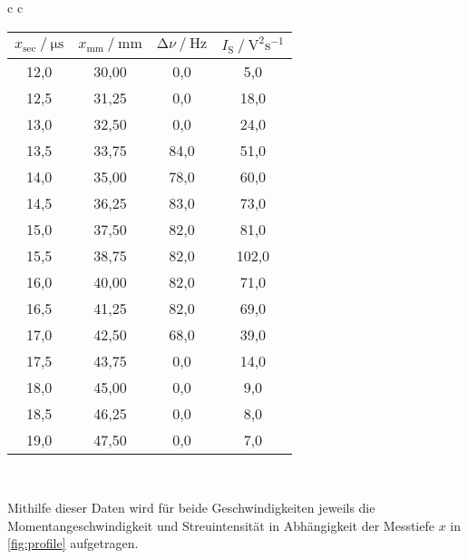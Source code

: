 \begin{table}[H]
\begin{tabular}{c c}
      \begin{tabular}{c c c c} 
          \hline
          \toprule
          $x_\text{sec} \mathbin{/} \unit{\micro\second}$ &
          $x_\text{mm} \mathbin{/} \unit{\milli\meter}$ &
          $\increment \nu \mathbin{/} \mathrm{Hz}$ &
          $I_\text{S} \mathbin{/} \mathrm{V^2 s^{-1}}$ \\
          \midrule
          12,0 & 30,00 &  0,0 &   5,0 \\
          12,5 & 31,25 &  0,0 &  18,0 \\
          13,0 & 32,50 &  0,0 &  24,0 \\
          13,5 & 33,75 & 84,0 &  51,0 \\
          14,0 & 35,00 & 78,0 &  60,0 \\
          14,5 & 36,25 & 83,0 &  73,0 \\
          15,0 & 37,50 & 82,0 &  81,0 \\
          15,5 & 38,75 & 82,0 & 102,0 \\
          16,0 & 40,00 & 82,0 &  71,0 \\
          16,5 & 41,25 & 82,0 &  69,0 \\
          17,0 & 42,50 & 68,0 &  39,0 \\
          17,5 & 43,75 &  0,0 &  14,0 \\
          18,0 & 45,00 &  0,0 &   9,0 \\
          18,5 & 46,25 &  0,0 &   8,0 \\
          19,0 & 47,50 &  0,0 &   7,0 \\
          \bottomrule
          \hline
      \end{tabular} \\
  \end{tabular}

\end{table}

Mithilfe dieser Daten wird für beide Geschwindigkeiten jeweils die Momentangeschwindigkeit und Streuintensität
in Abhängigkeit der Messtiefe $x$ in \autoref{fig:profile} aufgetragen.

